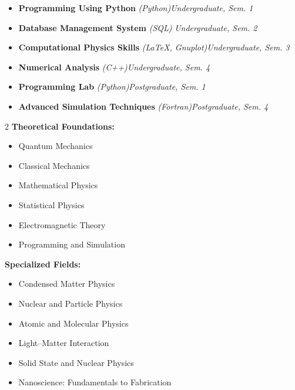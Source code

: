 \noindent {}
\begin{itemize}
\item \textbf{Programming Using Python} \emph{(Python)}\hfill \emph{Undergraduate, Sem. 1}
\item \textbf{Database Management System} \emph{(SQL)} \hfill \emph{Undergraduate, Sem. 2}
\item \textbf{Computational Physics Skills} \emph{(LaTeX, Gnuplot)}\hfill \emph{Undergraduate, Sem. 3}
\item \textbf{Numerical Analysis} \emph{(C++)}\hfill \emph{Undergraduate, Sem. 4}
\item \textbf{Programming Lab} \emph{(Python)}\hfill \emph{Postgraduate, Sem. 1}
\item \textbf{Advanced Simulation Techniques} \emph{(Fortran)}\hfill \emph{Postgraduate, Sem. 4}
\end{itemize}

\noindent {}
\begin{multicols}{2}
\textbf{Theoretical Foundations:}
\begin{itemize}
\item Quantum Mechanics
\item Classical Mechanics
\item Mathematical Physics
\item Statistical Physics
\item Electromagnetic Theory
\item Programming and Simulation
\end{itemize}
\columnbreak
\textbf{Specialized Fields:}
\begin{itemize}
\item Condensed Matter Physics
\item Nuclear and Particle Physics
\item Atomic and Molecular Physics
\item Light--Matter Interaction
\item Solid State and Nuclear Physics
\item Nanoscience: Fundamentals to Fabrication
\end{itemize}
\end{multicols}